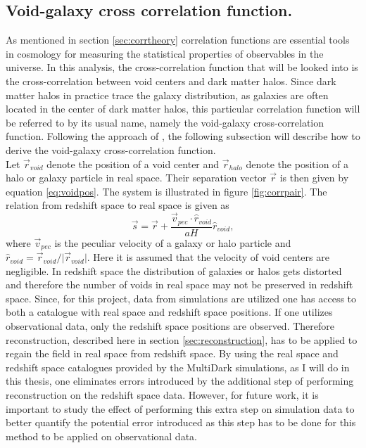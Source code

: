 \subsection{Void-galaxy cross correlation function.}\label{sec:vgcrosscorr}
As mentioned in section \ref{sec:corrtheory} correlation functions are
essential tools in cosmology for measuring the statistical properties of
observables in the universe. In this analysis, the cross-correlation function that
will be looked into is the cross-correlation between void centers and dark matter halos. Since dark matter halos in practice trace the galaxy distribution, as galaxies are often located in the center of dark matter halos, this particular correlation function will be referred to by its usual name, namely the void-galaxy cross-correlation function. Following the approach of \cite{Nadathur_corr}, the following
subsection will describe how to derive the void-galaxy cross-correlation
function. 
\\\indent
Let $\vec{r}_{void}$ denote the position of a void center and $\vec{r}_{halo}$ denote the
position of a halo or galaxy particle in real space. Their separation vector $\vec{r}$ is then
given by equation \ref{eq:voidpos}. The system is illustrated in figure \ref{fig:corrpair}. The relation from redshift space to real space
is given as
\begin{equation}\label{eq:s_to_r}
    \vec{s}=\vec{r}+\frac{\vec{v}_{pec}\cdot\hat{r}_{void}}{aH}\hat{r}_{void},
\end{equation}
where $\vec{v}_{pec}$ is the peculiar velocity of a galaxy or halo particle and
$\hat{r}_{void}=\vec{r}_{void}/ \vert \vec{r}_{void}\vert$. Here it is assumed
that the velocity of void centers are negligible. In redshift space the distribution of galaxies or halos gets distorted and therefore the number of voids in
real space may not be preserved in redshift space. Since, for this project, data from simulations are utilized one has access to both a catalogue with real space and redshift space positions. If one utilizes observational data, only the redshift space positions are observed. Therefore reconstruction,
described here in section \ref{sec:reconstruction}, has to be applied to regain
the field in real space from redshift space. By using the real space and redshift space catalogues provided by the MultiDark simulations\cite{Multidark_dataset}, as I will do in this thesis, one eliminates errors introduced by the additional step of performing reconstruction on the redshift space data. However, for future work, it is important to study the effect of performing this extra step on simulation data to better quantify the potential error introduced as this step has to be done for this method to be applied on observational data.\\\indent
